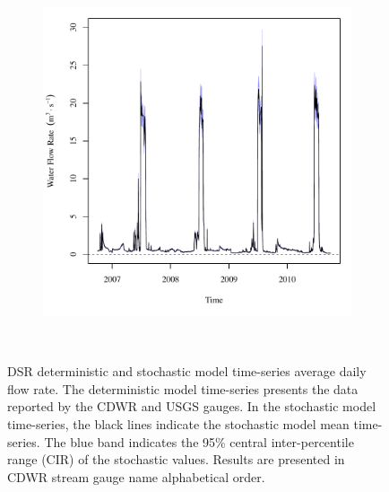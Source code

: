 \begin{landscape}
\begin{figure}
\begin{subfigure}{0.7\textwidth}
			\includegraphics[width=\tableCustomSize]{"Figures/Results_DSR/Stochastic/Q in"}
		\end{subfigure}\\
		\caption[DSR deterministic and stochastic model time-series average daily flow rate.]{DSR deterministic and stochastic model time-series average daily flow rate.  The deterministic model time-series presents the data reported by the CDWR and USGS gauges.  In the stochastic model time-series, the black lines indicate the stochastic model mean time-series.  The blue band indicates the 95\% central inter-percentile range (CIR) of the stochastic values.  Results are presented in CDWR stream gauge name alphabetical order.}
		\label{fig:GaugeFlow_DS}
	\end{figure}
\end{landscape}
\subfiguremid
